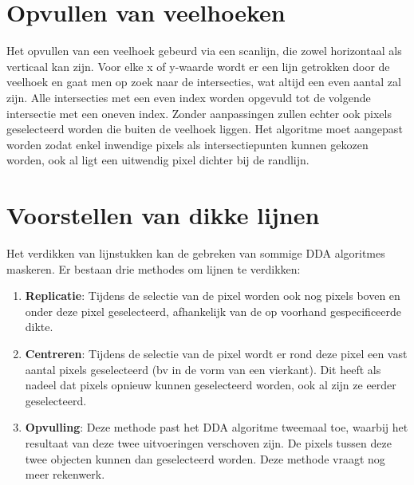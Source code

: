 \documentclass{report}
\begin{document}
	
	\section{Opvullen van veelhoeken}
	Het opvullen van een veelhoek gebeurd via een scanlijn, die zowel horizontaal als verticaal kan zijn. Voor elke x of y-waarde wordt er een lijn getrokken door de veelhoek en gaat men op zoek naar de intersecties, wat altijd een even aantal zal zijn. Alle intersecties met een even index worden opgevuld tot de volgende intersectie met een oneven index. Zonder aanpassingen zullen echter ook pixels geselecteerd worden die buiten de veelhoek liggen. Het algoritme moet aangepast worden zodat enkel inwendige pixels als intersectiepunten kunnen gekozen worden, ook al ligt een uitwendig pixel dichter bij de randlijn.
	
	\section{Voorstellen van dikke lijnen}
	Het verdikken van lijnstukken kan de gebreken van sommige DDA algoritmes maskeren. Er bestaan drie methodes om lijnen te verdikken:
	\begin{enumerate}
		\item \textbf{Replicatie}: Tijdens de selectie van de pixel worden ook nog pixels boven en onder deze pixel geselecteerd, afhankelijk van de op voorhand gespecificeerde dikte.
		\item \textbf{Centreren}: Tijdens de selectie van de pixel wordt er rond deze pixel een vast aantal pixels geselecteerd (bv in de vorm van een vierkant). Dit heeft als nadeel dat pixels opnieuw kunnen geselecteerd worden, ook al zijn ze eerder geselecteerd.
		\item \textbf{Opvulling}: Deze methode past het DDA algoritme tweemaal toe, waarbij het resultaat van deze twee uitvoeringen verschoven zijn. De pixels tussen deze twee objecten kunnen dan geselecteerd worden. Deze methode vraagt nog meer rekenwerk.
	\end{enumerate}
\end{document}
